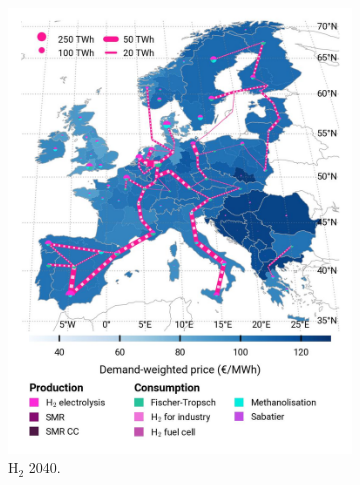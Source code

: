 \documentclass[pdflatex,sn-nature]{sn-jnl}%
\theoremstyle{thmstyleone}%
\theoremstyle{thmstyletwo}%
\theoremstyle{thmstylethree}%
\begin{document}
\begin{figure}[htbp]
\begin{subfigure}[t]{0.32\textwidth}
      \includegraphics[width=1\textwidth]{figures/maps/pcipmi/base_s_adm___2040-balance_map_H2.jpg}
      \caption{H$_2$ 2040.}
      \label{fig:PCI_lt_2040_h2}
  \end{subfigure}
  \begin{subfigure}[t]{0.32\textwidth}
    \vspace{0pt}

\end{subfigure}
\end{figure}
\end{document}
